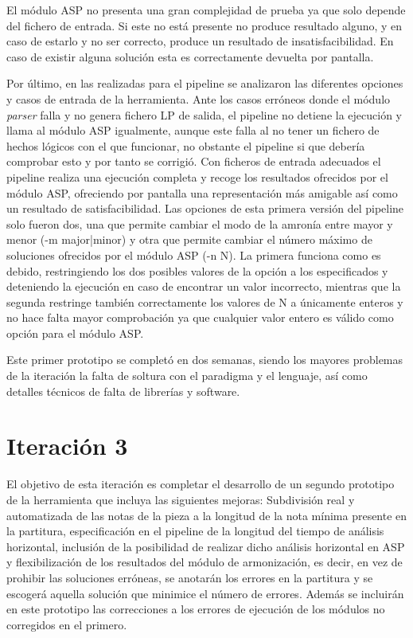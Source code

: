 El módulo ASP no presenta una gran complejidad de prueba ya que solo depende del fichero de entrada. Si este no está presente no produce resultado alguno, y en caso de estarlo y no ser correcto, produce un resultado de insatisfacibilidad. En caso de existir alguna solución esta es correctamente devuelta por pantalla.

Por último, en las realizadas para el pipeline se analizaron las diferentes opciones y casos de entrada de la herramienta. Ante los casos erróneos donde el módulo \textit{parser} falla y no genera fichero LP de salida, el pipeline no detiene la ejecución y llama al módulo ASP igualmente, aunque este falla al no tener un fichero de hechos lógicos con el que funcionar, no obstante el pipeline si que debería comprobar esto y por tanto se corrigió. Con ficheros de entrada adecuados el pipeline realiza una ejecución completa y recoge los resultados ofrecidos por el módulo ASP, ofreciendo por pantalla una representación más amigable así como un resultado de satisfacibilidad. Las opciones de esta primera versión del pipeline solo fueron dos, una que permite cambiar el modo de la amronía entre mayor y menor (-m major|minor) y otra que permite cambiar el número máximo de soluciones ofrecidos por el módulo ASP (-n N). La primera funciona como es debido, restringiendo los dos posibles valores de la opción a los especificados y deteniendo la ejecución en caso de encontrar un valor incorrecto, mientras que la segunda restringe también correctamente los valores de N a únicamente enteros y no hace falta mayor comprobación ya que cualquier valor entero es válido como opción para el módulo ASP.

Este primer prototipo se completó en dos semanas, siendo los mayores problemas de la iteración la falta de soltura con el paradigma y el lenguaje, así como detalles técnicos de falta de librerías y software. 


\section{Iteración 3}

El objetivo de esta iteración es completar el desarrollo de un segundo prototipo de la herramienta que incluya las siguientes mejoras: Subdivisión real y automatizada de las notas de la pieza a la longitud de la nota mínima presente en la partitura, especificación en el pipeline de la longitud del tiempo de análisis horizontal, inclusión de la posibilidad de realizar dicho análisis horizontal en ASP y flexibilización de los resultados del módulo de armonización, es decir, en vez de prohibir las soluciones erróneas, se anotarán los errores en la partitura y se escogerá aquella solución que minimice el número de errores. Además se incluirán en este prototipo las correcciones a los errores de ejecución de los módulos no corregidos en el primero.

